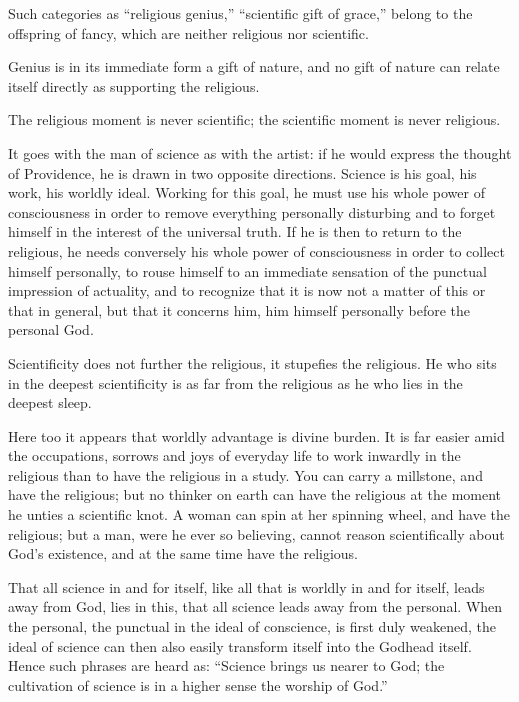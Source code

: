 \documentclass[12pt,a4paper,openany]{book}
\newcommand{\opage}[1]{\marginnote{\footnotesize\textit{[#1]}}}
\begin{document}
Such categories as ``religious genius,''
``scientific gift of grace,'' belong to the offspring
of fancy, which are neither religious
nor scientific.

Genius is in its immediate form a gift
of nature, and no gift of nature can relate
itself directly as supporting the religious.

The religious moment is never scientific;
the scientific moment is never religious.

It goes with the man of science as with
the artist: if he would express the thought of Providence,
he is drawn in two opposite directions.
Science is his goal, his work, his
\setcounter{footnote}{0}%
\opage{74}worldly ideal. Working for this goal,
he must use his whole power of consciousness in order to
remove everything personally disturbing and to forget himself
in the interest of the universal truth.
If he is then to return to the religious, he needs
conversely his whole power of consciousness in order to
collect himself personally, to rouse himself to an immediate
sensation of the punctual impression of actuality,
and to recognize that it is now not a matter of
this or that in general, but that it
concerns him, him himself personally before the personal God.

Scientificity does not further the religious,
it stupefies the religious. He who
sits in the deepest scientificity is as far
from the religious as he who lies
in the deepest sleep.

Here too it appears that worldly advantage
is divine burden. It is far easier amid the occupations, sorrows and
joys of everyday life to work inwardly in the religious than
to have the religious in a study. You
can carry a millstone, and have the religious;
but no thinker on earth can have
the religious at the moment he unties a
\setcounter{footnote}{0}%
\opage{75}scientific knot. A woman can spin at her
spinning wheel, and have the religious; but a man,
were he ever so believing, cannot reason
scientifically about God's existence, and at the same
time have the religious.

That all science in and for itself, like all
that is worldly in and for itself, leads away from God,
lies in this, that all science leads away from the
personal. When the personal, the punctual in the ideal of conscience,
is first duly weakened,
the ideal of science can then also easily transform
itself into the Godhead itself. Hence such
phrases are heard as: ``Science brings us
nearer to God; the cultivation of science is in a higher
sense the worship of God.''
\end{document}
